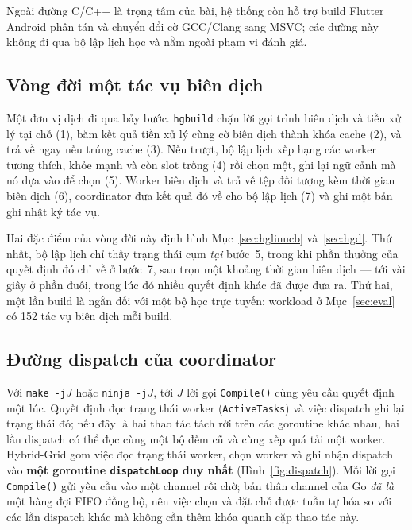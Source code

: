 \documentclass[final,5p,times,twocolumn]{elsarticle}
\begin{document}
Ngoài đường C/C++ là trọng tâm của bài, hệ thống còn hỗ trợ build Flutter Android phân tán và chuyển đổi cờ GCC/Clang sang MSVC; các đường này không đi qua bộ lập lịch học và nằm ngoài phạm vi đánh giá.

\subsection{Vòng đời một tác vụ biên dịch}
\label{sec:lifecycle}

Một đơn vị dịch đi qua bảy bước. \texttt{hgbuild} chặn lời gọi trình biên dịch và tiền xử lý tại chỗ (1), băm kết quả tiền xử lý cùng cờ biên dịch thành khóa cache (2), và trả về ngay nếu trúng cache (3). Nếu trượt, bộ lập lịch xếp hạng các worker tương thích, khỏe mạnh và còn slot trống (4) rồi chọn một, ghi lại ngữ cảnh mà nó dựa vào để chọn (5). Worker biên dịch và trả về tệp đối tượng kèm thời gian biên dịch (6), coordinator đưa kết quả đó về cho bộ lập lịch (7) và ghi một bản ghi nhật ký tác vụ.

Hai đặc điểm của vòng đời này định hình Mục~\ref{sec:hglinucb} và~\ref{sec:hgd}. Thứ nhất, bộ lập lịch chỉ thấy trạng thái cụm \emph{tại} bước~5, trong khi phần thưởng của quyết định đó chỉ về ở bước~7, sau trọn một khoảng thời gian biên dịch --- tới vài giây ở phần đuôi, trong lúc đó nhiều quyết định khác đã được đưa ra. Thứ hai, một lần build là ngắn đối với một bộ học trực tuyến: workload ở Mục~\ref{sec:eval} có 152 tác vụ biên dịch mỗi build.

\subsection{Đường dispatch của coordinator}
\label{sec:dispatch}

Với \texttt{make -j}$J$ hoặc \texttt{ninja -j}$J$, tới $J$ lời gọi \texttt{Compile()} cùng yêu cầu quyết định một lúc. Quyết định đọc trạng thái worker (\texttt{ActiveTasks}) và việc dispatch ghi lại trạng thái đó; nếu đây là hai thao tác tách rời trên các goroutine khác nhau, hai lần dispatch có thể đọc cùng một bộ đếm cũ và cùng xếp quá tải một worker. Hybrid-Grid gom việc đọc trạng thái worker, chọn worker và ghi nhận dispatch vào \textbf{một goroutine \texttt{dispatchLoop} duy nhất} (Hình~\ref{fig:dispatch}). Mỗi lời gọi \texttt{Compile()} gửi yêu cầu vào một channel rồi chờ; bản thân channel của Go \emph{đã là} một hàng đợi FIFO đồng bộ, nên việc chọn và đặt chỗ được tuần tự hóa so với các lần dispatch khác mà không cần thêm khóa quanh cặp thao tác này.
\end{document}
